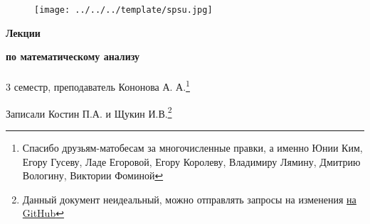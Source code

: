 \documentclass[main]{subfiles}
\begin{document}
	\begin{figure}[H]
			\texttt{[image: ../../../template/spsu.jpg]}
			\centering
	\end{figure}
	\vspace*{\fill}
	\begin{center}
		\huge \textbf{Лекции}

		\huge \textbf{по математическому анализу}\\ \ \\
		\Large 3 семестр, преподаватель Кононова А. А.\footnote{Спасибо друзьям-матобесам за многочисленные правки, а именно Юнии Ким, Егору Гусеву, Ладе Егоровой, Егору Королеву, Владимиру Лямину, Дмитрию Вологину, Виктории Фоминой}

		\large Записали Костин П.А. и Щукин И.В.\footnote{Данный документ неидеальный, можно отправлять запросы на изменения \href{https://github.com/KostinP/Mathematical-LecturesAndPractices}{на GitHub}}
	\end{center}
	\vspace*{\fill}
	\vspace*{\fill}

	\newpage
	\tableofcontents
	\newpage
\end{document}
